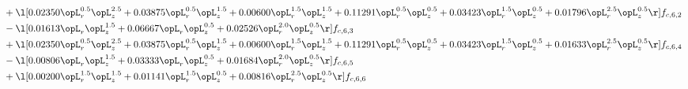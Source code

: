 \begin{alignat}{2}
& + \l[  0.02350 \opL_r^{0.5} \opL_z^{2.5} +  0.03875 \opL_r^{0.5} \opL_z^{1.5} +  0.00600 \opL_r^{1.5} \opL_z^{1.5} +  0.11291 \opL_r^{0.5} \opL_z^{0.5} +  0.03423 \opL_r^{1.5} \opL_z^{0.5} +  0.01796 \opL_r^{2.5} \opL_z^{0.5}  \r] f_{c,6,2} \nonumber \\ 
& - \l[  0.01613 \opL_r \opL_z^{1.5} +  0.06667 \opL_r \opL_z^{0.5} +  0.02526 \opL_r^{2.0} \opL_z^{0.5}  \r] f_{c,6,3} \nonumber \\ 
& + \l[  0.02350 \opL_r^{0.5} \opL_z^{2.5} +  0.03875 \opL_r^{0.5} \opL_z^{1.5} +  0.00600 \opL_r^{1.5} \opL_z^{1.5} +  0.11291 \opL_r^{0.5} \opL_z^{0.5} +  0.03423 \opL_r^{1.5} \opL_z^{0.5} +  0.01633 \opL_r^{2.5} \opL_z^{0.5}  \r] f_{c,6,4} \nonumber \\ 
& - \l[  0.00806 \opL_r \opL_z^{1.5} +  0.03333 \opL_r \opL_z^{0.5} +  0.01684 \opL_r^{2.0} \opL_z^{0.5}  \r] f_{c,6,5} \nonumber \\ 
& + \l[  0.00200 \opL_r^{1.5} \opL_z^{1.5} +  0.01141 \opL_r^{1.5} \opL_z^{0.5} +  0.00816 \opL_r^{2.5} \opL_z^{0.5}  \r] f_{c,6,6} \nonumber \\ 
\end{alignat} 


